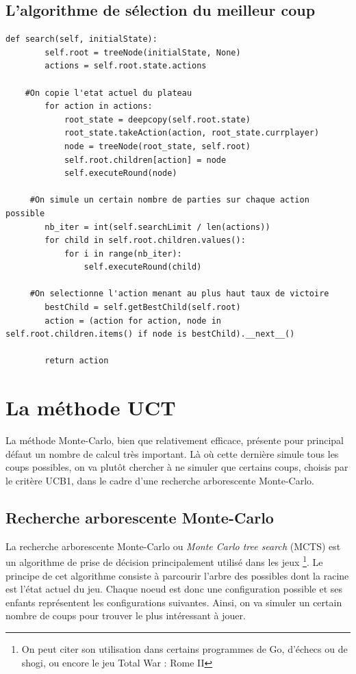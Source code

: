 \documentclass[a4paper]{article}
\theoremstyle{definition}
\begin{document}
\subsection{L'algorithme de sélection du meilleur coup}

\begin{lstlisting}
def search(self, initialState):
        self.root = treeNode(initialState, None)
        actions = self.root.state.actions
 
	#On copie l'etat actuel du plateau
        for action in actions:
            root_state = deepcopy(self.root.state)
            root_state.takeAction(action, root_state.currplayer)
            node = treeNode(root_state, self.root)
            self.root.children[action] = node
            self.executeRound(node)
	
	 #On simule un certain nombre de parties sur chaque action possible
        nb_iter = int(self.searchLimit / len(actions))
        for child in self.root.children.values():
            for i in range(nb_iter):
                self.executeRound(child)

	 #On selectionne l'action menant au plus haut taux de victoire
        bestChild = self.getBestChild(self.root)
        action = (action for action, node in self.root.children.items() if node is bestChild).__next__()
            
        return action
\end{lstlisting}

\clearpage

\section{La méthode UCT}

La méthode Monte-Carlo, bien que relativement efficace, présente pour principal défaut un nombre de calcul très important. Là où cette dernière simule tous les coups possibles, on va plutôt chercher à ne simuler que certains coups, choisis par le critère UCB1, dans le cadre d'une recherche arborescente Monte-Carlo.

\subsection{Recherche arborescente Monte-Carlo}

La recherche arborescente Monte-Carlo ou \textit{Monte Carlo tree search} (MCTS) est un algorithme de prise de décision principalement utilisé dans les jeux \footnote{On peut citer son utilisation dans certains programmes de Go, d'échecs ou de shogi, ou encore le jeu Total War : Rome II}. Le principe de cet algorithme consiste à parcourir l'arbre des possibles dont la racine est l'état actuel du jeu. Chaque noeud est donc une configuration possible et ses enfants représentent les configurations suivantes. Ainsi, on va simuler un certain nombre de coups pour trouver le plus intéressant à jouer.
\end{document}
